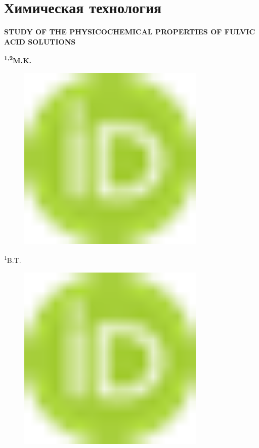 \let\cleardoublepage\clearpage
\chapter{Химическая технология}

{\bfseries STUDY OF THE PHYSICOCHEMICAL PROPERTIES OF FULVIC ACID
SOLUTIONS}

{\bfseries \textsuperscript{1,2}M.K.
\begin{figure}[H]
	\centering
	\includegraphics[width=0.8\textwidth]{media/chem/image1}
	\caption*{}
\end{figure}

\textsuperscript{1}B.T.
\begin{figure}[H]
	\centering
	\includegraphics[width=0.8\textwidth]{media/chem/image1}
	\caption*{}
\end{figure}

}
